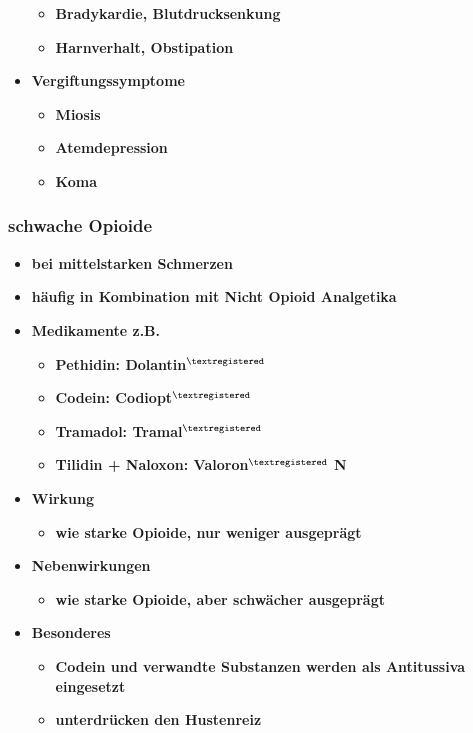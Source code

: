 \begin{itemize}
			\begin{itemize}
				\item \textbf{Bradykardie, Blutdrucksenkung}
				\item \textbf{Harnverhalt, Obstipation}
			\end{itemize}
		\item \textbf{Vergiftungssymptome}
			\begin{itemize}
				\item \textbf{Miosis}
				\item \textbf{Atemdepression}
				\item \textbf{Koma}
			\end{itemize}
	\end{itemize}
		
\subsubsection{schwache Opioide}
	\begin{itemize}
		\item \textbf{bei mittelstarken Schmerzen}
		\item \textbf{häufig in Kombination mit Nicht Opioid Analgetika}
		\item \textbf{Medikamente z.B.}
			\begin{itemize}
				\item \textbf{Pethidin:  Dolantin$^{\textregistered}$}
				\item \textbf{Codein:  Codiopt$^{\textregistered}$}
				\item \textbf{Tramadol: Tramal$^{\textregistered}$}
				\item \textbf{Tilidin + Naloxon:  Valoron$^{\textregistered}$ N}
			\end{itemize}
		\item \textbf{Wirkung}
			\begin{itemize}
				\item \textbf{wie starke Opioide, nur weniger ausgeprägt}
			\end{itemize}
		\item \textbf{Nebenwirkungen}
			\begin{itemize}
				\item \textbf{wie starke Opioide, aber schwächer ausgeprägt}
			\end{itemize}
		\item \textbf{Besonderes}
			\begin{itemize}
				\item \textbf{Codein und verwandte Substanzen werden als Antitussiva eingesetzt}
				\item \textbf{unterdrücken den Hustenreiz}
			\end{itemize}
	\end{itemize}